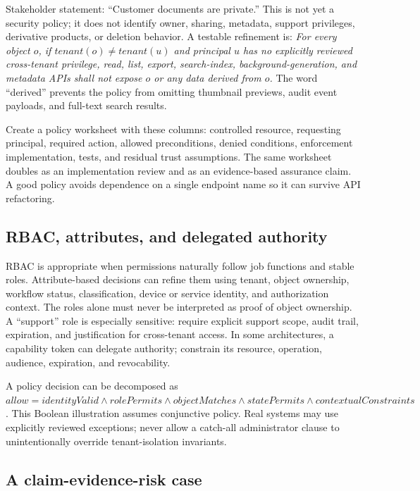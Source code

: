 \documentclass[
  letterpaper,
]{article}
\begin{document}
Stakeholder statement: ``Customer documents are private.'' This is not
yet a security policy; it does not identify owner, sharing, metadata,
support privileges, derivative products, or deletion behavior. A
testable refinement is: \emph{For every object \(o\), if
\(tenant(o)\neq tenant(u)\) and principal \(u\) has no explicitly
reviewed cross-tenant privilege, read, list, export, search-index,
background-generation, and metadata APIs shall not expose \(o\) or any
data derived from \(o\).} The word ``derived'' prevents the policy from
omitting thumbnail previews, audit event payloads, and full-text search
results.

Create a policy worksheet with these columns: controlled resource,
requesting principal, required action, allowed preconditions, denied
conditions, enforcement implementation, tests, and residual trust
assumptions. The same worksheet doubles as an implementation review and
as an evidence-based assurance claim. A good policy avoids dependence on
a single endpoint name so it can survive API refactoring.

\subsection{RBAC, attributes, and delegated
authority}\label{rbac-attributes-and-delegated-authority}

RBAC is appropriate when permissions naturally follow job functions and
stable roles. Attribute-based decisions can refine them using tenant,
object ownership, workflow status, classification, device or service
identity, and authorization context. The roles alone must never be
interpreted as proof of object ownership. A ``support'' role is
especially sensitive: require explicit support scope, audit trail,
expiration, and justification for cross-tenant access. In some
architectures, a capability token can delegate authority; constrain its
resource, operation, audience, expiration, and revocability.

A policy decision can be decomposed as
\(allow = identityValid \land rolePermits \land objectMatches \land statePermits \land contextualConstraints\).
This Boolean illustration assumes conjunctive policy. Real systems may
use explicitly reviewed exceptions; never allow a catch-all
administrator clause to unintentionally override tenant-isolation
invariants.

\subsection{A claim-evidence-risk
case}\label{a-claim-evidence-risk-case}
\end{document}
